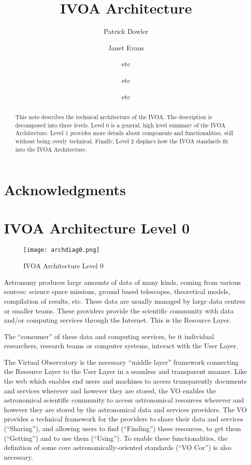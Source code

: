 \documentclass[11pt,a4paper]{ivoa}
\title{IVOA Architecture}
\author{Patrick Dowler}
\author{Janet Evans}
\author{etc}
\author{etc}
\author{etc}
\begin{document}
\begin{abstract}
This note describes the technical architecture of the IVOA. The description is decomposed into three levels. Level 0 is a general, high level summary of the IVOA Architecture. Level 1 provides more details about components and functionalities, still without being overly technical. Finally, Level 2 displays how the IVOA standards fit into the IVOA Architecture. 
\end{abstract}

\section*{Acknowledgments}

\section{IVOA Architecture Level 0}

\begin{figure}
\centering
\texttt{[image: archdiag0.png]}
\caption{IVOA Architecture Level 0}
\label{fig:architecture}
\end{figure}

Astronomy produces large amounts of data of many kinds, coming from various sources: science  space missions, ground based telescopes, theoretical models, compilation of results, etc.  These data are usually managed by large data centres or smaller teams. These providers provide  the scientific community with data and/or computing services through the Internet. This is the Resource Layer. 

The ``consumer'' of these data and computing services, be it individual researchers, research teams or computer systems, interact with the User Layer. 

The Virtual Observatory is the necessary ``middle layer'' framework connecting the Resource Layer to the User Layer in a seamless and transparent manner. Like the web which enables end  users and machines to access transparently documents and services wherever and however they are stored, the VO enables the astronomical scientific community to access astronomical resources   wherever and however they are stored by the astronomical data and services providers. The VO provides a technical framework for the providers to share their data and services (``Sharing''), and allowing users to find (``Finding'') these resources, to get them (``Getting'') and to use them (``Using''). To enable these functionalities, the definition of some core astronomically-oriented standards (``VO Cor'') is also necessary.
\end{document}
